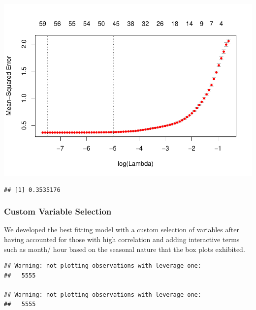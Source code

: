 \documentclass[american,]{article}
\newenvironment{Shaded}{\begin{snugshade}}{\end{snugshade}}
\newcommand{\CommentTok}[1]{\textcolor[rgb]{0.56,0.35,0.01}{\textit{#1}}}
\newcommand{\DataTypeTok}[1]{\textcolor[rgb]{0.13,0.29,0.53}{#1}}
\newcommand{\DecValTok}[1]{\textcolor[rgb]{0.00,0.00,0.81}{#1}}
\newcommand{\KeywordTok}[1]{\textcolor[rgb]{0.13,0.29,0.53}{\textbf{#1}}}
\newcommand{\NormalTok}[1]{#1}
\newcommand{\OperatorTok}[1]{\textcolor[rgb]{0.81,0.36,0.00}{\textbf{#1}}}
\newcommand{\StringTok}[1]{\textcolor[rgb]{0.31,0.60,0.02}{#1}}
\begin{document}
\includegraphics{BikeSharingDemand_files/figure-latex/unnamed-chunk-1-1.pdf}

\begin{Shaded}
\end{Shaded}

\begin{verbatim}
## [1] 0.3535176
\end{verbatim}

\hypertarget{custom-variable-selection}{%
\subsubsection{Custom Variable Selection}\label{custom-variable-selection}}

We developed the best fitting model with a custom selection of variables after having accounted for those with high correlation and adding interactive terms such as month/ hour based on the seasonal nature that the box plots exhibited.

\begin{verbatim}
## Warning: not plotting observations with leverage one:
##   5555

## Warning: not plotting observations with leverage one:
##   5555
\end{verbatim}
\end{document}
